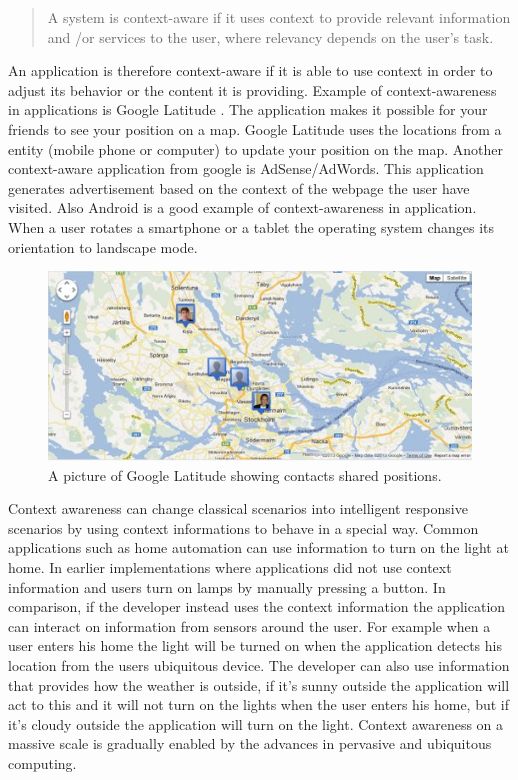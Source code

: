 \begin{quotation}
A system is context-aware if it uses context to provide relevant information and \slash or services to the user, where relevancy depends on the user's task. \cite{dey2001understanding}
\end{quotation}

An application is therefore context-aware if it is able to use context in order to adjust its behavior or the content it is providing. Example of context-awareness in applications is Google Latitude \cite{GoogleLatitude}. The application makes it possible for your friends to see your position on a map. Google Latitude uses the locations from a entity (mobile phone or computer) to update your position on the map. Another context-aware application from google is AdSense/AdWords. This application generates advertisement based on the context of the webpage the user have visited. Also Android is a good example of context-awareness in application. When a user rotates a smartphone or a tablet the operating system changes its orientation to landscape mode.

\begin{figure}[t] %
	\centering
    	\includegraphics[scale=0.75]{part_2/context_awareness/latitude_pic.jpg}
		\caption{A picture of Google Latitude showing contacts shared positions.} 
\end{figure}

Context awareness can change classical scenarios into intelligent responsive scenarios by using context informations to behave in a special way. Common applications such as home automation can use information to turn on the light at home. In earlier implementations where applications did not use context information and users turn on lamps by manually pressing a button. In comparison, if the developer instead uses the context information the application can interact on information from sensors around the user. For example when a user enters his home the light will be turned on when the application detects his location from the users ubiquitous device. The developer can also use information that provides how the weather is outside, if it's sunny outside the application will act to this and it will not turn on the lights when the user enters his home, but if it's cloudy outside the application will turn on the light. Context awareness on a massive scale is gradually enabled by the advances in pervasive and ubiquitous computing.	

